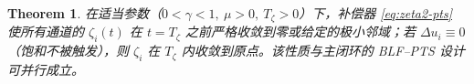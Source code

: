 \documentclass[pdflatex,sn-mathphys-num]{sn-jnl}%
\theoremstyle{thmstyleone}%
\newtheorem{theorem}{Theorem}%
\theoremstyle{thmstyletwo}%
\newtheorem{remark}{Remark}%
\theoremstyle{thmstylethree}%
\begin{document}




\begin{theorem}\label{thm:u-only}
	在适当参数（$0<\gamma<1,\ \mu>0,\ T_\zeta>0$）下，补偿器 \eqref{eq:zeta2-pts} 使所有通道的 $\zeta_{i}(t)$ 在 $t=T_\zeta$ 之前严格收敛到零或给定的极小邻域；若 $\Delta u_i\equiv 0$（饱和不被触发），则 $\zeta_{i}$ 在 $T_\zeta$ 内收敛到原点。该性质与主闭环的 BLF–PTS 设计可并行成立。
	\end{theorem}
	
\end{document}
